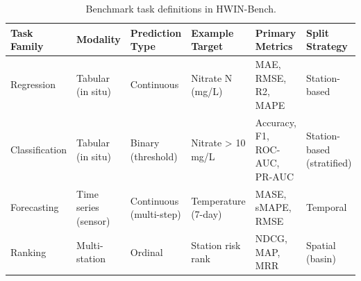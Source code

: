 \begin{table}
\caption{Benchmark task definitions in HWIN-Bench.}
\label{tab:tasks}
\begin{tabular}{llllll}
\toprule
Task Family & Modality & Prediction Type & Example Target & Primary Metrics & Split Strategy \\
\midrule
Regression & Tabular (in situ) & Continuous & Nitrate N (mg/L) & MAE, RMSE, R2, MAPE & Station-based \\
Classification & Tabular (in situ) & Binary (threshold) & Nitrate > 10 mg/L & Accuracy, F1, ROC-AUC, PR-AUC & Station-based (stratified) \\
Forecasting & Time series (sensor) & Continuous (multi-step) & Temperature (7-day) & MASE, sMAPE, RMSE & Temporal \\
Ranking & Multi-station & Ordinal & Station risk rank & NDCG, MAP, MRR & Spatial (basin) \\
\bottomrule
\end{tabular}
\end{table}
